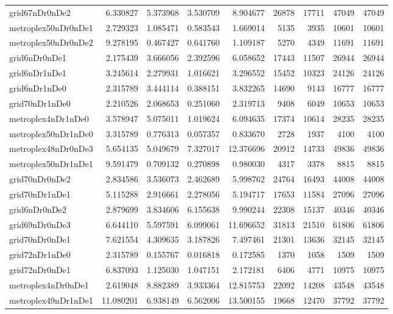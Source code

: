 \begin{longtable}{|l|r|r|r|r|r|r|r|r|}
grid67nDr0nDe2 & 6.330827 & 5.373968 & 3.530709 & 8.904677 & 26878 & 17711 & 47049 & 47049 \\
metroplex50nDr0nDe1 & 2.729323 & 1.085471 & 0.583543 & 1.669014 & 5135 & 3935 & 10601 & 10601 \\
metroplex50nDr0nDe2 & 9.278195 & 0.467427 & 0.641760 & 1.109187 & 5270 & 4349 & 11691 & 11691 \\
grid6nDr0nDe1 & 2.175439 & 3.666056 & 2.392596 & 6.058652 & 17443 & 11507 & 26944 & 26944 \\
grid6nDr1nDe1 & 3.245614 & 2.279931 & 1.016621 & 3.296552 & 15452 & 10323 & 24126 & 24126 \\
grid6nDr1nDe0 & 2.315789 & 3.444114 & 0.388151 & 3.832265 & 14690 & 9143 & 16777 & 16777 \\
grid70nDr1nDe0 & 2.210526 & 2.068653 & 0.251060 & 2.319713 & 9408 & 6049 & 10653 & 10653 \\
metroplex4nDr1nDe0 & 3.578947 & 5.075011 & 1.019624 & 6.094635 & 17374 & 10614 & 28235 & 28235 \\
metroplex50nDr1nDe0 & 3.315789 & 0.776313 & 0.057357 & 0.833670 & 2728 & 1937 & 4100 & 4100 \\
metroplex48nDr0nDe3 & 5.654135 & 5.049679 & 7.327017 & 12.376696 & 20912 & 14733 & 49836 & 49836 \\
metroplex50nDr1nDe1 & 9.591479 & 0.709132 & 0.270898 & 0.980030 & 4317 & 3378 & 8815 & 8815 \\
grid70nDr0nDe2 & 2.834586 & 3.536073 & 2.462689 & 5.998762 & 24764 & 16493 & 44008 & 44008 \\
grid70nDr1nDe1 & 5.115288 & 2.916661 & 2.278056 & 5.194717 & 17653 & 11584 & 27096 & 27096 \\
grid6nDr0nDe2 & 2.879699 & 3.834606 & 6.155638 & 9.990244 & 22308 & 15137 & 40346 & 40346 \\
grid69nDr0nDe3 & 6.644110 & 5.597591 & 6.099061 & 11.696652 & 31813 & 21510 & 61806 & 61806 \\
grid70nDr0nDe1 & 7.621554 & 4.309635 & 3.187826 & 7.497461 & 21301 & 13636 & 32145 & 32145 \\
grid72nDr1nDe0 & 2.315789 & 0.155767 & 0.016818 & 0.172585 & 1370 & 1058 & 1509 & 1509 \\
grid72nDr0nDe1 & 6.837093 & 1.125030 & 1.047151 & 2.172181 & 6406 & 4771 & 10975 & 10975 \\
metroplex4nDr0nDe1 & 2.619048 & 8.882389 & 3.933364 & 12.815753 & 22092 & 14208 & 43548 & 43548 \\
metroplex49nDr1nDe1 & 11.080201 & 6.938149 & 6.562006 & 13.500155 & 19668 & 12470 & 37792 & 37792 \\

\end{longtable}
